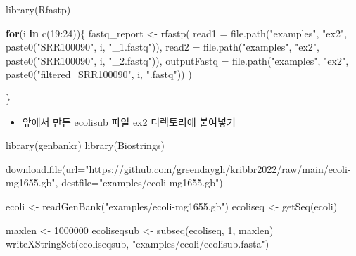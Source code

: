 \documentclass[
]{book}
\newenvironment{Shaded}{\begin{snugshade}}{\end{snugshade}}
\newcommand{\AttributeTok}[1]{\textcolor[rgb]{0.77,0.63,0.00}{#1}}
\newcommand{\ControlFlowTok}[1]{\textcolor[rgb]{0.13,0.29,0.53}{\textbf{#1}}}
\newcommand{\DecValTok}[1]{\textcolor[rgb]{0.00,0.00,0.81}{#1}}
\newcommand{\FunctionTok}[1]{\textcolor[rgb]{0.00,0.00,0.00}{#1}}
\newcommand{\NormalTok}[1]{#1}
\newcommand{\OtherTok}[1]{\textcolor[rgb]{0.56,0.35,0.01}{#1}}
\newcommand{\SpecialCharTok}[1]{\textcolor[rgb]{0.00,0.00,0.00}{#1}}
\newcommand{\StringTok}[1]{\textcolor[rgb]{0.31,0.60,0.02}{#1}}
\providecommand{\tightlist}{%
  \setlength{\itemsep}{0pt}\setlength{\parskip}{0pt}}
\begin{document}
\begin{Shaded}
\begin{Highlighting}[]
\FunctionTok{library}\NormalTok{(Rfastp)}


\ControlFlowTok{for}\NormalTok{(i }\ControlFlowTok{in} \FunctionTok{c}\NormalTok{(}\DecValTok{19}\SpecialCharTok{:}\DecValTok{24}\NormalTok{))\{}
\NormalTok{  fastq\_report }\OtherTok{\textless{}{-}} \FunctionTok{rfastp}\NormalTok{(}
  \AttributeTok{read1 =} \FunctionTok{file.path}\NormalTok{(}\StringTok{"examples"}\NormalTok{, }\StringTok{"ex2"}\NormalTok{, }\FunctionTok{paste0}\NormalTok{(}\StringTok{"SRR100090"}\NormalTok{, i, }\StringTok{"\_1.fastq"}\NormalTok{)),}
  \AttributeTok{read2 =} \FunctionTok{file.path}\NormalTok{(}\StringTok{"examples"}\NormalTok{, }\StringTok{"ex2"}\NormalTok{, }\FunctionTok{paste0}\NormalTok{(}\StringTok{"SRR100090"}\NormalTok{, i, }\StringTok{"\_2.fastq"}\NormalTok{)),}
  \AttributeTok{outputFastq =} \FunctionTok{file.path}\NormalTok{(}\StringTok{"examples"}\NormalTok{, }\StringTok{"ex2"}\NormalTok{, }\FunctionTok{paste0}\NormalTok{(}\StringTok{"filtered\_SRR100090"}\NormalTok{, i, }\StringTok{".fastq"}\NormalTok{))}
\NormalTok{)}
  
\NormalTok{\}}
\end{Highlighting}
\end{Shaded}

\begin{itemize}
\tightlist
\item
  앞에서 만든 ecolisub 파일 ex2 디렉토리에 붙여넣기
\end{itemize}

\begin{Shaded}
\begin{Highlighting}[]
\FunctionTok{library}\NormalTok{(genbankr)}
\FunctionTok{library}\NormalTok{(Biostrings)}

\FunctionTok{download.file}\NormalTok{(}\AttributeTok{url=}\StringTok{"https://github.com/greendaygh/kribbr2022/raw/main/ecoli{-}mg1655.gb"}\NormalTok{, }\AttributeTok{destfile=}\StringTok{"examples/ecoli{-}mg1655.gb"}\NormalTok{)}

\NormalTok{ecoli }\OtherTok{\textless{}{-}} \FunctionTok{readGenBank}\NormalTok{(}\StringTok{"examples/ecoli{-}mg1655.gb"}\NormalTok{)}
\NormalTok{ecoliseq }\OtherTok{\textless{}{-}} \FunctionTok{getSeq}\NormalTok{(ecoli)}


\NormalTok{maxlen }\OtherTok{\textless{}{-}} \DecValTok{1000000}
\NormalTok{ecoliseqsub }\OtherTok{\textless{}{-}} \FunctionTok{subseq}\NormalTok{(ecoliseq, }\DecValTok{1}\NormalTok{, maxlen)}
\FunctionTok{writeXStringSet}\NormalTok{(ecoliseqsub, }\StringTok{"examples/ecoli/ecolisub.fasta"}\NormalTok{)}
\end{Highlighting}
\end{Shaded}
\end{document}
